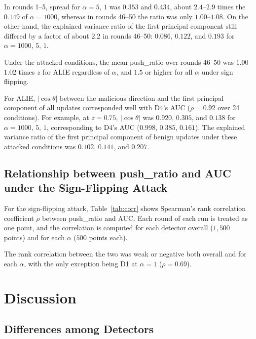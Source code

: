 \documentclass[a4paper,10pt]{article}
\newcommand{\PushRatio}{\textrm{push\_ratio}}
\newcommand{\Spread}{\textrm{spread}}
\begin{document}
In rounds 1--5, \Spread{} for $\alpha=5,\,1$ was $0.353$ and $0.434$, about $2.4$--$2.9$ times the $0.149$ of $\alpha=1000$, whereas in rounds 46--50 the ratio was only $1.00$--$1.08$. On the other hand, the explained variance ratio of the first principal component still differed by a factor of about $2.2$ in rounds 46--50: $0.086$, $0.122$, and $0.193$ for $\alpha=1000,\,5,\,1$.

Under the attacked conditions, the mean \PushRatio{} over rounds 46--50 was $1.00$--$1.02$ times $z$ for ALIE regardless of $\alpha$, and $1.5$ or higher for all $\alpha$ under sign flipping.

For ALIE, $|\cos\theta|$ between the malicious direction and the first principal component of all updates corresponded well with D4's AUC ($\rho=0.92$ over 24 conditions). For example, at $z=0.75$, $|\cos\theta|$ was $0.920$, $0.305$, and $0.138$ for $\alpha=1000,\,5,\,1$, corresponding to D4's AUC ($0.998$, $0.385$, $0.161$). The explained variance ratio of the first principal component of benign updates under these attacked conditions was $0.102$, $0.141$, and $0.207$.

\subsection{Relationship between \PushRatio{} and AUC under the Sign-Flipping Attack}
\label{sec:res-pushratio}

For the sign-flipping attack, Table~\ref{tab:corr} shows Spearman's rank correlation coefficient $\rho$ between \PushRatio{} and AUC. Each round of each run is treated as one point, and the correlation is computed for each detector overall ($1{,}500$ points) and for each $\alpha$ ($500$ points each).

The rank correlation between the two was weak or negative both overall and for each $\alpha$, with the only exception being D1 at $\alpha=1$ ($\rho=0.69$).

\section{Discussion}
\label{sec:discussion}

\subsection{Differences among Detectors}
\label{sec:disc-detectors}
\end{document}
